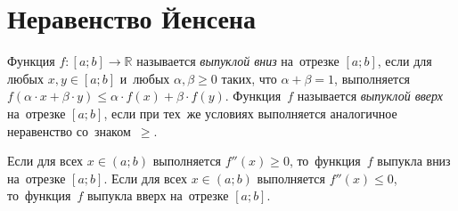 
\section*{Неравенство Йенсена}


Функция $f \colon [a; b] \to \mathbb{R}$ называется \emph{выпуклой вниз}
на~отрезке $[a; b]$, если для любых $x, y \in [a; b]$ и~любых
$\alpha, \beta \geq 0$ таких, что $\alpha + \beta = 1$, выполняется
\(
    f(\alpha \cdot x + \beta \cdot y)
\leq
    \alpha \cdot f(x)+ \beta \cdot f(y)
\).
Функция~$f$ называется \emph{выпуклой вверх} на~отрезке $[a; b]$, если при
тех~же условиях выполняется аналогичное неравенство со~знаком~$\geq$.

\theorem
Если для всех $x \in (a; b)$ выполняется $f''(x) \geq 0$, то~функция~$f$
выпукла вниз на~отрезке $[a; b]$.
Если для всех $x \in (a; b)$ выполняется $f''(x) \leq 0$, то~функция~$f$
выпукла вверх на~отрезке $[a; b]$.

